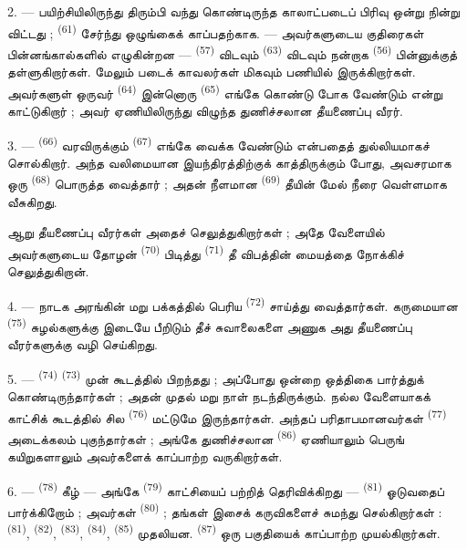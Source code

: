 2. --- பயிற்சியிலிருந்து திரும்பி வந்து கொண்டிருந்த காலாட்படைப் பிரிவு
ஒன்று நின்று விட்டது ; 
\textsuperscript{(61)} சேர்ந்து ஒழுங்கைக் காப்பதற்காக.
 — அவர்களுடைய குதிரைகள் பின்னங்கால்களில்
எழுகின்றன —  \textsuperscript{(57)} விடவும்
 \textsuperscript{(63)} விடவும் நன்றாக
 \textsuperscript{(56)} பின்னுக்குத்
தள்ளுகிறார்கள். மேலும் படைக் காவலர்கள் மிகவும் பணியில்
இருக்கிறார்கள். அவர்களுள் ஒருவர் 
\textsuperscript{(64)} இன்னொரு 
\textsuperscript{(65)} எங்கே கொண்டு போக வேண்டும் என்று
காட்டுகிறார் ; அவர் ஏணியிலிருந்து விழுந்த துணிச்சலான தீயணைப்பு
வீரர்.

3. ---  \textsuperscript{(66)} வரவிருக்கும்
 \textsuperscript{(67)} எங்கே வைக்க
வேண்டும் என்பதைத் துல்லியமாகச் சொல்கிறார். அந்த வலிமையான
இயந்திரத்திற்குக் காத்திருக்கும் போது, அவசரமாக ஒரு  \textsuperscript{(68)} பொருத்த வைத்தார் ; அதன்
நீளமான  \textsuperscript{(69)} தீயின் மேல் நீரை
வெள்ளமாக வீசுகிறது.

ஆறு தீயணைப்பு வீரர்கள் அதைச் செலுத்துகிறார்கள் ; அதே வேளையில்
அவர்களுடைய தோழன்  \textsuperscript{(70)}
பிடித்து  \textsuperscript{(71)} தீ விபத்தின்
மையத்தை நோக்கிச் செலுத்துகிறான்.

4. --- நாடக அரங்கின் மறு பக்கத்தில் பெரிய 
\textsuperscript{(72)} சாய்த்து வைத்தார்கள். கருமையான 
\textsuperscript{(75)} சுழல்களுக்கு இடையே பீறிடும் தீச் சுவாலைகளை
அணுக அது தீயணைப்பு வீரர்களுக்கு வழி செய்கிறது.

\VUsaut{5.0mm}
\VUsaut{3.4mm}

5. ---  \textsuperscript{(74)}  \textsuperscript{(73)} முன் கூடத்தில் பிறந்தது ; அப்போது
 ஒன்றை ஒத்திகை பார்த்துக் கொண்டிருந்தார்கள் ;
அதன் முதல்  மறு நாள் நடந்திருக்கும். நல்ல வேளையாகக்
காட்சிக் கூடத்தில் சில  \textsuperscript{(76)}
மட்டுமே இருந்தார்கள். அந்தப் பரிதாபமானவர்கள் 
\textsuperscript{(77)} அடைக்கலம் புகுந்தார்கள் ; அங்கே துணிச்சலான
 \textsuperscript{(86)} ஏணியாலும் பெருங்
கயிறுகளாலும் அவர்களைக் காப்பாற்ற வருகிறார்கள்.

6. ---  \textsuperscript{(78)} கீழ் —
அங்கே  \textsuperscript{(79)} காட்சியைப் பற்றித்
தெரிவிக்கிறது —  \textsuperscript{(81)}
ஓடுவதைப் பார்க்கிறோம் ; அவர்கள் 
\textsuperscript{(80)} ; தங்கள் இசைக் கருவிகளைச் சுமந்து செல்கிறார்கள் :
 \textsuperscript{(81)}, 
\textsuperscript{(82)},  \textsuperscript{(83)},
 \textsuperscript{(84)}, 
\textsuperscript{(85)} முதலியன. 
\textsuperscript{(87)} ஒரு பகுதியைக் காப்பாற்ற முயல்கிறார்கள்.

